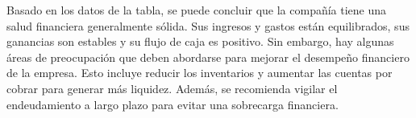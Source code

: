 
                Basado en los datos de la tabla, se puede concluir que la compañía tiene una salud financiera generalmente sólida. Sus ingresos y gastos están equilibrados, sus ganancias son estables y su flujo de caja es positivo. Sin embargo, hay algunas áreas de preocupación que deben abordarse para mejorar el desempeño financiero de la empresa. Esto incluye reducir los inventarios y aumentar las cuentas por cobrar para generar más liquidez. Además, se recomienda vigilar el endeudamiento a largo plazo para evitar una sobrecarga financiera.
